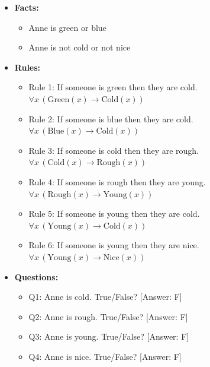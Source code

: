 \documentclass{article} %
\begin{document}
\begin{itemize}
    \item \textbf{Facts:}
    \begin{itemize}
        \item Anne is green or blue
        \item Anne is not cold or not nice
    \end{itemize}
    
    \item \textbf{Rules:}
    \begin{itemize}
        \item Rule 1: If someone is green then they are cold. $\forall x \, (\text{Green}(x) \rightarrow \text{Cold}(x))$
        \item Rule 2: If someone is blue then they are cold. $\forall x \, (\text{Blue}(x) \rightarrow \text{Cold}(x))$
        \item Rule 3: If someone is cold then they are rough. $\forall x \, (\text{Cold}(x) \rightarrow \text{Rough}(x))$
        \item Rule 4: If someone is rough then they are young. $\forall x \, (\text{Rough}(x) \rightarrow \text{Young}(x))$
        \item Rule 5: If someone is young then they are cold. $\forall x \, (\text{Young}(x) \rightarrow \text{Cold}(x))$
        \item Rule 6: If someone is young then they are nice. $\forall x \, (\text{Young}(x) \rightarrow \text{Nice}(x))$
        
    \end{itemize}
    
    \item \textbf{Questions:}
    \begin{itemize}
        \item Q1: Anne is cold. True/False? [Answer: F] 
        \item Q2: Anne is rough. True/False? [Answer: F] 
        \item Q3: Anne is young. True/False? [Answer: F] 
        \item Q4: Anne is nice. True/False? [Answer: F] 
    \end{itemize}
\end{itemize}
\end{document}
